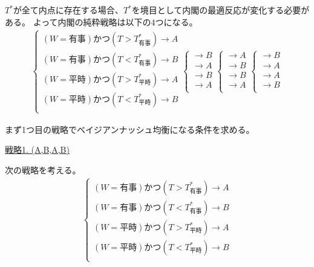 \documentclass[main.tex]{subfiles}
\begin{document}
$T^*$が全て内点に存在する場合、$T^*$を境目として内閣の最適反応が変化する必要がある。
よって内閣の純粋戦略は以下の4つになる。
\begin{align*}
    \begin{cases}
        (W=有事) かつ (T>T^*_{有事})  \rightarrow A\\
        (W=有事) かつ (T<T^*_{有事})  \rightarrow B\\
        (W=平時) かつ (T>T^*_{平時})  \rightarrow A\\
        (W=平時) かつ (T<T^*_{平時})   \rightarrow B\\
    \end{cases}
    \begin{cases}
        \rightarrow B\\
        \rightarrow A\\
        \rightarrow B\\
        \rightarrow A\\
    \end{cases}
    \begin{cases}
        \rightarrow A\\
        \rightarrow B\\
        \rightarrow B\\
        \rightarrow A\\
    \end{cases}
    \begin{cases}
        \rightarrow B\\
        \rightarrow A\\
        \rightarrow A\\
        \rightarrow B\\
    \end{cases}
\end{align*}




まず1つ目の戦略でベイジアンナッシュ均衡になる条件を求める。

\bigskip
\noindent
\underline{戦略1. (A,B,A,B)}

次の戦略を考える。
\begin{align*}
    \begin{cases}
        (W=有事) かつ (T>T^*_{有事})  \rightarrow A\\
        (W=有事) かつ (T<T^*_{有事})  \rightarrow B\\
        (W=平時) かつ (T>T^*_{平時})  \rightarrow A\\
        (W=平時) かつ (T<T^*_{平時})   \rightarrow B\\
    \end{cases}
\end{align*}
\end{document}
